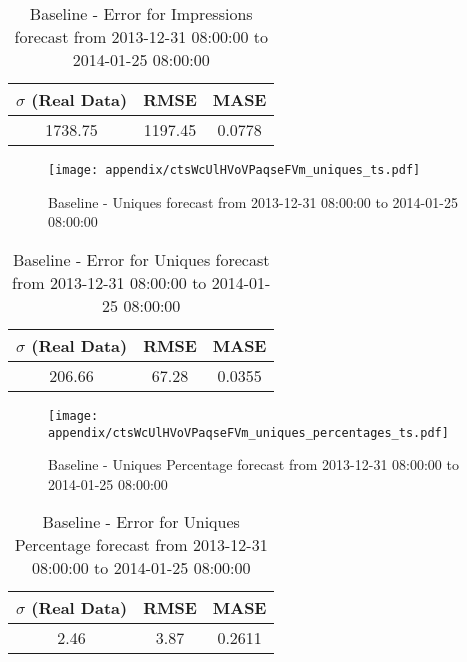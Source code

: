 \begin{table}[H]
\centering
\footnotesize
\begin{tabular}{ccc}
$\sigma$ (Real Data) & RMSE & MASE   \\ \hline
1738.75 & 1197.45 & 0.0778 \\
\end{tabular}

\vspace{0.5cm}

\caption[]{
Baseline - Error for Impressions forecast from 2013-12-31 08:00:00 to 2014-01-25 08:00:00}
\end{table}

\begin{figure}[H] \begin{center} \leavevmode
\texttt{[image: appendix/ctsWcUlHVoVPaqseFVm\_uniques\_ts.pdf]} \caption[]{
Baseline - Uniques forecast from 2013-12-31 08:00:00 to 2014-01-25 08:00:00} \label{fig:appendix/ctsWcUlHVoVPaqseFVm_uniques_ts.pdf} \end{center}
\end{figure}

\begin{table}[H]
\centering
\footnotesize
\begin{tabular}{ccc}
$\sigma$ (Real Data) & RMSE & MASE   \\ \hline
206.66 & 67.28 & 0.0355 \\
\end{tabular}

\vspace{0.5cm}

\caption[]{
Baseline - Error for Uniques forecast from 2013-12-31 08:00:00 to 2014-01-25 08:00:00}
\end{table}

\begin{figure}[H] \begin{center} \leavevmode
\texttt{[image: appendix/ctsWcUlHVoVPaqseFVm\_uniques\_percentages\_ts.pdf]} \caption[]{
Baseline - Uniques Percentage forecast from 2013-12-31 08:00:00 to 2014-01-25 08:00:00} \label{fig:appendix/ctsWcUlHVoVPaqseFVm_uniques_percentages_ts.pdf} \end{center}
\end{figure}

\begin{table}[H]
\centering
\footnotesize
\begin{tabular}{ccc}
$\sigma$ (Real Data) & RMSE & MASE   \\ \hline
2.46 & 3.87 & 0.2611 \\
\end{tabular}

\vspace{0.5cm}

\caption[]{
Baseline - Error for Uniques Percentage forecast from 2013-12-31 08:00:00 to 2014-01-25 08:00:00}
\end{table}


